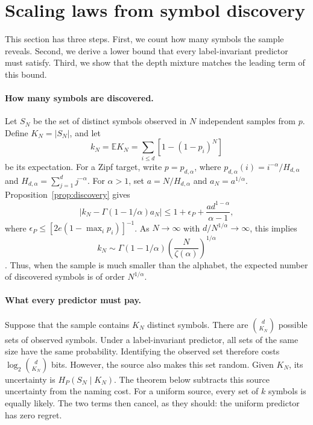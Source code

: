 \documentclass[anon]{alt2027}
\newcommand{\E}{\mathbb{E}}
\begin{document}
\section{Scaling laws from symbol discovery}
\label{sec:scaling}

This section has three steps. First, we count how many symbols the sample reveals. Second, we derive a lower bound that every label-invariant predictor must satisfy. Third, we show that the depth mixture matches the leading term of this bound.  \paragraph{How many symbols are discovered.} Let $S_N$ be the set of distinct symbols observed in $N$ independent samples from $p$. Define $K_N=|S_N|$, and let \[ k_N=\E K_N=\sum_{i\le d}\left[1-(1-p_i)^N\right] \] be its expectation. For a Zipf target, write $p=p_{d,\alpha}$, where $p_{d,\alpha}(i)=i^{-\alpha}/H_{d,\alpha}$ and $H_{d,\alpha}=\sum_{j=1}^d j^{-\alpha}$. For $\alpha>1$, set $a=N/H_{d,\alpha}$ and $a_N=a^{1/\alpha}$. Proposition~\ref{prop:discovery} gives \[ \left|k_N-\Gamma(1-1/\alpha)a_N\right| \le 1+\epsilon_P+\frac{ad^{1-\alpha}}{\alpha-1}, \] where $\epsilon_P\le[2e(1-\max_i p_i)]^{-1}$. As $N\to\infty$ with $d/N^{1/\alpha}\to\infty$, this implies \[ k_N\sim\Gamma(1-1/\alpha)\left(\frac{N}{\zeta(\alpha)}\right)^{1/\alpha} \] \citep{karlin1967central,gnedin2007notes}. Thus, when the sample is much smaller than the alphabet, the expected number of discovered symbols is of order $N^{1/\alpha}$.

\paragraph{What every predictor must pay.}
Suppose that the sample contains $K_N$ distinct symbols.
There are $\binom{d}{K_N}$ possible sets of observed symbols. Under a
label-invariant predictor, all sets of the same size have the same probability. Identifying
the observed set therefore costs $\log_2\binom{d}{K_N}$ bits. However, the source also makes this
set random. Given $K_N$, its uncertainty is
$H_P(S_N\mid K_N)$. The theorem below subtracts this source uncertainty from
the naming cost. For a uniform source,
every set of $k$ symbols is equally likely. The two terms then cancel, as they should:
the uniform predictor has zero regret.
\end{document}
